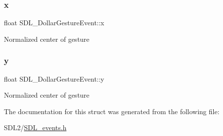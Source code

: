 \subsubsection{\texorpdfstring{x}{x}}
{\footnotesize\ttfamily float S\+D\+L\+\_\+\+Dollar\+Gesture\+Event\+::x}

Normalized center of gesture \mbox{\label{struct_s_d_l___dollar_gesture_event_a293b2303acc1cfc63c167c5525e6eab5}} 
\subsubsection{\texorpdfstring{y}{y}}
{\footnotesize\ttfamily float S\+D\+L\+\_\+\+Dollar\+Gesture\+Event\+::y}

Normalized center of gesture 

The documentation for this struct was generated from the following file\+:\begin{DoxyCompactItemize}
\item 
S\+D\+L2/\hyperlink{_s_d_l__events_8h}{S\+D\+L\+\_\+events.\+h}\end{DoxyCompactItemize}
